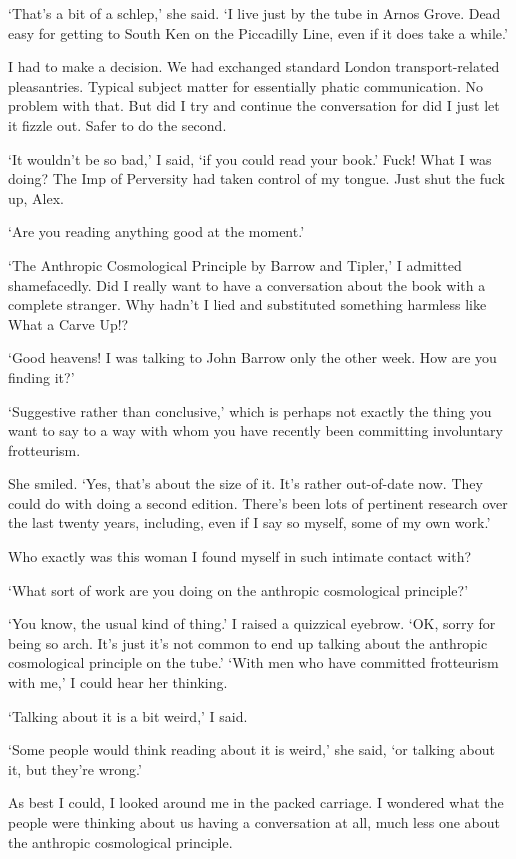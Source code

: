 `That's a bit of a schlep,' she said. `I live just by the tube in
Arnos Grove. Dead easy for getting to South Ken on the Piccadilly Line,
even if it does take a while.'

I had to make a decision. We had exchanged standard London
transport-related pleasantries. Typical subject matter for
essentially phatic communication. No problem with that. But did I
try and continue the conversation for did I just let it fizzle out.
Safer to do the second.

`It wouldn't be so bad,' I said, `if you could read your book.'
Fuck! What I was doing? The Imp of Perversity had taken control of
my tongue. Just shut the fuck up, Alex.

`Are you reading anything good at the moment.'

`{\twelvesl The Anthropic Cosmological Principle\/} by Barrow and
Tipler,' I admitted shamefacedly. Did I really want to have a
conversation about the book with a complete stranger. Why hadn't I
lied and substituted something harmless like {\twelvesl What a Carve
Up!}?

`Good heavens! I was talking to John Barrow only the other week. How
are you finding it?'

`Suggestive rather than conclusive,' which is perhaps not exactly
the thing you want to say to a way with whom you have recently been
committing involuntary frotteurism.

She smiled. `Yes, that's about the size of it. It's rather
out-of-date now. They could do with doing a second edition. There's
been lots of pertinent research over the last twenty years, including, even if I say so myself, some of my own work.'

Who exactly was this woman I found myself in such intimate contact
with?

`What sort of work are you doing on the anthropic cosmological
principle?'

`You know, the usual kind of thing.' I raised a quizzical
eyebrow. `OK, sorry for being so arch. It's just it's not common to end up talking about the anthropic cosmological principle on the
tube.' `With men who have committed frotteurism with me,' I could
hear her thinking.

`Talking about it is a bit weird,' I said.

`Some people would think reading about it is weird,' she said, `or talking about it, but they're wrong.'

As best I could, I looked around me in the packed carriage. I wondered what the
people were thinking about us having a conversation at all, much
less one about the anthropic cosmological principle.


